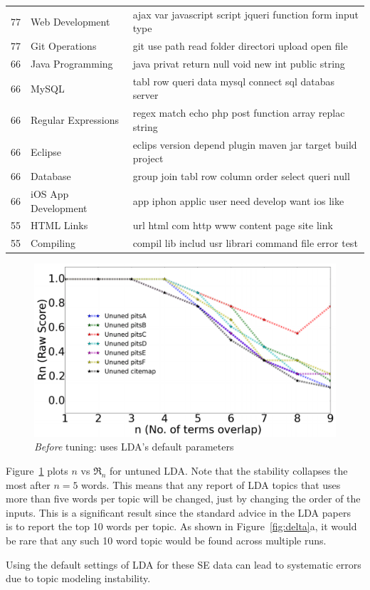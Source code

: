 \documentclass[twocolumn,5p,sort&compress]{elsarticle}
\theoremstyle{break}
\begin{document}
\begin{table}[!t]
\begin{center}
\begin{tabular}{r|l|l}
77 &Web Development & ajax var javascript script jqueri function form input type\\
77 &Git Operations & git use path read folder directori upload open file \\
66 &Java Programming & java privat return null void new  int public string\\
66 &MySQL & tabl row queri data mysql connect sql databas server\\
66 &Regular Expressions & regex match echo php post function array replac string\\
66 &Eclipse & eclips version depend plugin maven jar target build  project\\
66 &Database & group join tabl row column order select  queri null\\
66 &iOS App Development & app iphon applic user need  develop want ios like\\
55 &HTML Links & url html com http www content page site  link\\
55 & Compiling & compil lib includ usr librari  command file error test\\
\end{tabular}
\end{center}
\end{table}
 
\begin{figure}[!b]
  \begin{center}
    \includegraphics[width=\linewidth]{./fig/Vem_untuned.png}
    \end{center}
  \caption{{\em Before} tuning: uses LDA's default parameters}\label{fig:delta11}  
\end{figure}


Figure~\ref{fig:delta11}   plots $n$ vs $\Re_n$ for untuned  LDA.
Note that the  stability collapses the most after $n=5$ words. This means
  that any report of LDA topics that uses more than five words per topic will
  be changed, just by changing the order of the inputs. This is a significant result
  since the standard advice in the LDA papers~\cite{panichella2013effectively, lukins2010bug}
  is to report the top 10 words per topic. As shown in Figure~\ref{fig:delta}a, it would
  be rare that any such 10 word topic would be found across multiple runs.
 \begin{lesson}
  Using the default settings of LDA for these SE data can lead to systematic errors due to topic
  modeling instability. 
\end{lesson}
\end{document}
